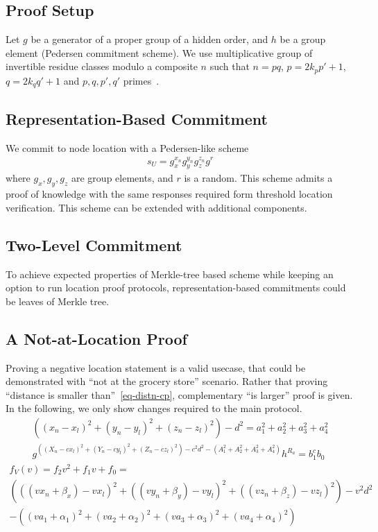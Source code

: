 \documentclass{article}
\begin{document}
\subsection{Proof Setup}

Let $g$ be a generator of a proper group of a hidden order,
and $h$ be a group element (Pedersen commitment scheme).
We use multiplicative group of invertible residue classes modulo a composite $n$ such that
$n=pq$, $p=2 k_p p'+1$, $q=2 k_q q'+1$ and $p, q, p', q'$ primes~\cite{Idemix}.

\subsection{Representation-Based Commitment}
We commit to node location with a Pedersen-like scheme~\cite{PedersenCommit,BrandsPKIbook}
\begin{gather}
\label{cmt-up-cp}
  s_U = g_x^{x_n} g_y^{y_n} g_z^{z_n} g^{r}
\end{gather}
where $g_x, g_y, g_z$ are group elements, and $r$ is a random.
This scheme admits a proof of knowledge with the same responses required form threshold location verification.
This scheme can be extended with additional components. %

\subsection{Two-Level Commitment}
To achieve expected properties of Merkle-tree based scheme while keeping an option
to run location proof protocols,
representation-based commitments could be leaves of Merkle tree.

\subsection{A Not-at-Location Proof}

Proving a negative location statement is a valid usecase,
that could be demonstrated with ``not at the grocery store'' scenario.
Rather that proving ``distance is smaller than''~\eqref{eq-distn-cp},
complementary ``is larger'' proof is given. %
In the following, we only show changes required to the main protocol.
\begin{gather}
\label{eq-distn-more}
  ((x_n - x_l)^2 + (y_n - y_l)^2 + (z_n - z_l)^2) - d^2 = a_1^2 + a_2^2 + a_3^2 + a_4^2  \\
\label{verf-distn-more}
  g^{((X_n - c x_l)^2 + (Y_n - c y_l)^2 + (Z_n - c z_l)^2 ) - c^2 d^2 - (A_1^2 + A_2^2 + A_3^2 + A_4^2)} h^{R_a} = b_1^{c} b_0 
\end{gather}
\begin{multline}
\label{eq-coeff-more}
  f_V(v) = f_2 v^2 + f_1 v + f_0 = \\
  (((v x_n + \beta_x) - v x_l)^2 +
   ((v y_n + \beta_y) - v y_l)^2 +
   ((v z_n + \beta_z) - v z_l)^2)
  - v^2 d^2 \\
  - ((v a_1 + \alpha_1)^2 +
     (v a_2 + \alpha_2)^2 +
     (v a_3 + \alpha_3)^2 +
     (v a_4 + \alpha_4)^2)
\end{multline}
\end{document}
